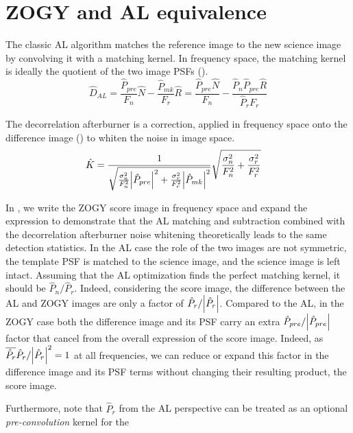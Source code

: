 \section{ZOGY and AL equivalence\label{sec:ALZOGYequiv}}
\par The classic AL algorithm matches the reference image to the new
science image by convolving it with a matching kernel. In frequency
space, the matching kernel is ideally the quotient of the two image
PSFs ().
%
\begin{equation}
  \hat{D}_{AL} =
  \frac{\hat{P}_{pre}}{F_n}\hat{N} -
    \frac{\hat{P}_{mk}}{F_r}\hat{R}
  =
  \frac{\hat{P}_{pre}\hat{N}}{F_n} -
    \frac{\hat{P}_n\hat{P}_{pre}\hat{R}}{\hat{P}_r F_r}
                 \label{eq:Dal}
\end{equation}
%
\par The decorrelation afterburner is a correction, applied in frequency
space onto the difference image () to whiten the noise in
image space.
%
\begin{align}
\hat{K}  &= \frac
  {1}
  {\sqrt{\frac{\sigma_n^2}{F_n^2}\abs{\hat{P}_{pre}}^2 +
      \frac{\sigma_r^2}{F_r^2}\abs{\hat{P}_{mk}}^2}}
  \sqrt{\frac{\sigma_n^2}{F_n^2} + \frac{\sigma_r^2}{F_r^2}}\label{eq:K}
\end{align}
%
\par In , we write the ZOGY score image in frequency
space and expand the expression to demonstrate that the AL matching
and subtraction combined with the decorrelation afterburner noise
whitening theoretically leads to the same detection statistics.  In
the AL case the role of the two images are not symmetric, the template
PSF is matched to the science image, and the science image is left
intact. Assuming that the AL optimization finds the perfect matching
kernel, it should be \(\hat{P}_n/\hat{P}_r\). Indeed, considering the
score image, the difference between the AL and ZOGY images are only a
factor of \(\hat{P}_r/\abs{\hat{P}_r}\). Compared to the AL, in the
ZOGY case both the difference image and its PSF carry an extra
\(\hat{P}_{pre}/\abs{\hat{P}_{pre}}\) factor that cancel from the
overall expression of the score image. Indeed, as
\(\overline{\hat{P}_r}\hat{P}_r/\abs{\hat{P}_r}^2 = 1\) at all
frequencies, we can reduce or expand this factor in the difference
image and its PSF terms without changing their resulting product, the
score image.
%
\par Furthermore, note that \(\hat{P}_r\) from the AL perspective can
be treated as an optional \emph{pre-convolution} kernel for the
